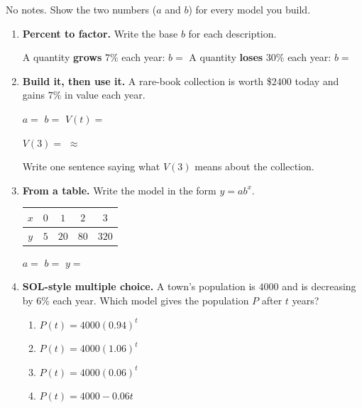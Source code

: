 \documentclass[10pt]{article}
\begin{document}
\namedateperiod

\vspace{0.08in}

No notes. Show the two numbers ($a$ and $b$) for every model you build.

\begin{enumerate}[leftmargin=1.8em, itemsep=9pt]
  \item \textbf{Percent to factor.} Write the base $b$ for each description.

        \vspace{3pt}
        A quantity \textbf{grows} $7\%$ each year: \; $b=$ \blank{2.0cm} \qquad
        A quantity \textbf{loses} $30\%$ each year: \; $b=$ \blank{2.0cm}

  \item \textbf{Build it, then use it.} A rare-book collection is worth \$$2400$ today and gains
        $7\%$ in value each year.

        \vspace{3pt}
        $a=$ \blank{1.8cm} \quad $b=$ \blank{1.8cm} \quad
        $V(t)=$ \blank{3.6cm}

        \vspace{4pt}
        $V(3)=$ \blank{3.0cm} $\approx$ \blank{2.0cm}

        \vspace{3pt}
        Write one sentence saying what $V(3)$ means about the collection. \writeline

  \item \textbf{From a table.} Write the model in the form $y=ab^{x}$.
    \begin{center}
    \renewcommand{\arraystretch}{1.3}
    \begin{tabular}{|c|c|c|c|c|}
    \hline
    $x$ & $0$ & $1$ & $2$ & $3$ \\ \hline
    $y$ & $5$ & $20$ & $80$ & $320$ \\ \hline
    \end{tabular}
    \end{center}
    $a=$ \blank{1.6cm} \quad $b=$ \blank{1.6cm} \quad $y=$ \blank{3.0cm}

  \item \textbf{SOL-style multiple choice.} A town's population is $4000$ and is decreasing by $6\%$
        each year. Which model gives the population $P$ after $t$ years?
        \begin{enumerate}[label=\Alph*., leftmargin=1.9em, itemsep=1pt]
          \item $P(t) = 4000(0.94)^{t}$
          \item $P(t) = 4000(1.06)^{t}$
          \item $P(t) = 4000(0.06)^{t}$
          \item $P(t) = 4000 - 0.06t$
        \end{enumerate}
\end{enumerate}
\end{document}
